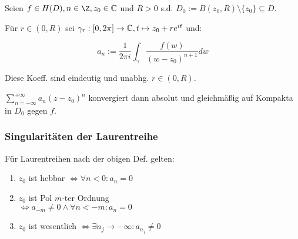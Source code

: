 Seien $f \in H(D), n \in \Z, z_0 \in \C$ und $R > 0$ s.d. $D_0 := B(z_0,R) \setminus \{z_0\} \subseteq D$.

Für $r \in (0,R)$ sei $\gamma_r : [0,2\pi] \to \mathbb{C}, t \mapsto z_0 + re^{it}$ und:

$$a_n := \frac{1}{2\pi i} \int_\gamma \frac{f(w)}{(w-z_0)^{n+1}} dw$$

Diese Koeff. sind eindeutig und unabhg. $r \in (0,R)$.

\spacing

$\sum_{n=-\infty}^{+\infty} a_n(z-z_0)^n$ konvergiert dann absolut und gleichmäßig auf Kompakta in $D_0$ gegen $f$.

\subsubsection*{Singularitäten der Laurentreihe}

Für Laurentreihen nach der obigen Def. gelten:

\begin{enumerate}[label=(\alph*)]
	\item $z_0$ ist hebbar $\iff \forall n < 0 : a_n = 0$
	\item $z_0$ ist Pol $m$-ter Ordnung \\ $\iff a_{-m} \neq 0 \land \forall n < -m : a_n = 0$
	\item $z_0$ ist wesentlich $\iff \exists n_j \to -\infty : a_{n_j} \neq 0$
\end{enumerate}
